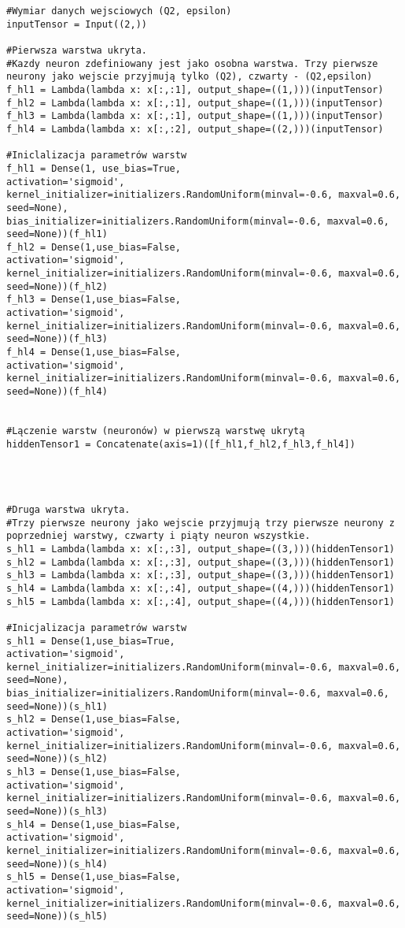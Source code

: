 \documentclass[11pt]{book}
\theoremstyle{definition}
\begin{document}
\begin{lstlisting}
#Wymiar danych wejsciowych (Q2, epsilon)
inputTensor = Input((2,))

#Pierwsza warstwa ukryta. 
#Kazdy neuron zdefiniowany jest jako osobna warstwa. Trzy pierwsze neurony jako wejscie przyjmują tylko (Q2), czwarty - (Q2,epsilon)
f_hl1 = Lambda(lambda x: x[:,:1], output_shape=((1,)))(inputTensor)
f_hl2 = Lambda(lambda x: x[:,:1], output_shape=((1,)))(inputTensor)
f_hl3 = Lambda(lambda x: x[:,:1], output_shape=((1,)))(inputTensor)
f_hl4 = Lambda(lambda x: x[:,:2], output_shape=((2,)))(inputTensor)

#Iniclalizacja parametrów warstw
f_hl1 = Dense(1, use_bias=True,
activation='sigmoid', 
kernel_initializer=initializers.RandomUniform(minval=-0.6, maxval=0.6, seed=None),
bias_initializer=initializers.RandomUniform(minval=-0.6, maxval=0.6, seed=None))(f_hl1)
f_hl2 = Dense(1,use_bias=False,
activation='sigmoid', 
kernel_initializer=initializers.RandomUniform(minval=-0.6, maxval=0.6, seed=None))(f_hl2)
f_hl3 = Dense(1,use_bias=False,
activation='sigmoid', 
kernel_initializer=initializers.RandomUniform(minval=-0.6, maxval=0.6, seed=None))(f_hl3)   
f_hl4 = Dense(1,use_bias=False,
activation='sigmoid', 
kernel_initializer=initializers.RandomUniform(minval=-0.6, maxval=0.6, seed=None))(f_hl4)


#Lączenie warstw (neuronów) w pierwszą warstwę ukrytą
hiddenTensor1 = Concatenate(axis=1)([f_hl1,f_hl2,f_hl3,f_hl4])




#Druga warstwa ukryta. 
#Trzy pierwsze neurony jako wejscie przyjmują trzy pierwsze neurony z poprzedniej warstwy, czwarty i piąty neuron wszystkie.
s_hl1 = Lambda(lambda x: x[:,:3], output_shape=((3,)))(hiddenTensor1)
s_hl2 = Lambda(lambda x: x[:,:3], output_shape=((3,)))(hiddenTensor1)
s_hl3 = Lambda(lambda x: x[:,:3], output_shape=((3,)))(hiddenTensor1)
s_hl4 = Lambda(lambda x: x[:,:4], output_shape=((4,)))(hiddenTensor1)
s_hl5 = Lambda(lambda x: x[:,:4], output_shape=((4,)))(hiddenTensor1)

#Inicjalizacja parametrów warstw
s_hl1 = Dense(1,use_bias=True,
activation='sigmoid', 
kernel_initializer=initializers.RandomUniform(minval=-0.6, maxval=0.6, seed=None),
bias_initializer=initializers.RandomUniform(minval=-0.6, maxval=0.6, seed=None))(s_hl1)
s_hl2 = Dense(1,use_bias=False,
activation='sigmoid', 
kernel_initializer=initializers.RandomUniform(minval=-0.6, maxval=0.6, seed=None))(s_hl2)
s_hl3 = Dense(1,use_bias=False,
activation='sigmoid', 
kernel_initializer=initializers.RandomUniform(minval=-0.6, maxval=0.6, seed=None))(s_hl3)   
s_hl4 = Dense(1,use_bias=False,
activation='sigmoid', 
kernel_initializer=initializers.RandomUniform(minval=-0.6, maxval=0.6, seed=None))(s_hl4)
s_hl5 = Dense(1,use_bias=False,
activation='sigmoid', 
kernel_initializer=initializers.RandomUniform(minval=-0.6, maxval=0.6, seed=None))(s_hl5)


\end{lstlisting}
\end{document}
